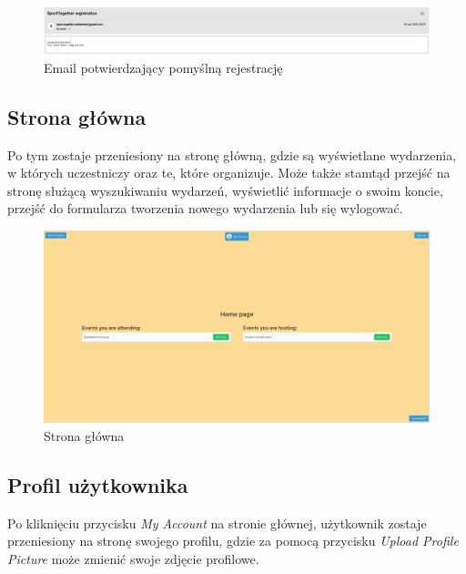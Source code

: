 \documentclass[11pt,a4paper]{article}
\begin{document}
\begin{figure} [H]
    \centering
    \includegraphics[width=1\linewidth]{pages/email.png}
    \caption{Email potwierdzający pomyślną rejestrację}
\end{figure}

\subsection{Strona główna}

Po tym zostaje przeniesiony na stronę główną, gdzie są wyświetlane wydarzenia, w których uczestniczy oraz te, które organizuje. Może także stamtąd przejść na stronę służącą wyszukiwaniu wydarzeń, wyświetlić informacje o swoim koncie, przejść do formularza tworzenia nowego wydarzenia lub się wylogować.

\begin{figure} [H]
    \centering
    \includegraphics[width=1\linewidth]{pages/home.png}
    \caption{Strona główna}
\end{figure}

\subsection{Profil użytkownika}

Po kliknięciu przycisku \textit{My Account} na stronie głównej, użytkownik zostaje przeniesiony na stronę swojego profilu, gdzie za pomocą przycisku \textit{Upload Profile Picture} może zmienić swoje zdjęcie profilowe.
\end{document}
